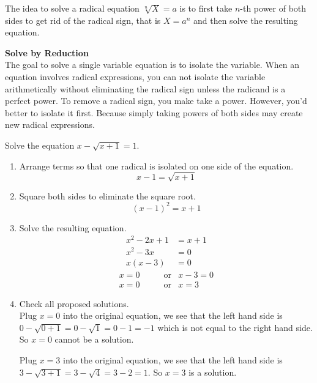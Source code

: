 \documentclass[
  en,11pt]{elegantbook}
\newcommand{\size}[2]{{\fontsize{#1}{0}\selectfont#2}}
\renewenvironment{example}[1][]{
  \refstepcounter{exam}
  \par\noindent\textbf{\color{main}{\examplename} \theexam #1}
  \rmfamily
}{
  \par\ignorespacesafterend
}
\newenvironment{rmdtip}{
	\vspace*{0.5\baselineskip}
	\par\noindent
	\makebox[-3pt][r]{\color{red!90}\size{12}{\HandRight}\,\,}
    \begin{tcolorbox}[
    enhanced,
    title={\textbf{\color{second}Tips}},
    title style={left color=blue!10!green!20!white,right color=yellow!20!blue!20!white},
    colback=cyan!10!white,
    ]
    \sffamily
}{
    \end{tcolorbox}
    \par\ignorespacesafterend
}
\begin{document}
The idea to solve a radical equation \(\sqrt[n]{X}=a\) is to first take \(n\)-th power of both sides to get rid of the radical sign, that is \(X=a^n\) and then solve the resulting equation.

\begin{rmdtip}

\textbf{Solve by Reduction}\\
The goal to solve a single variable equation is to isolate the variable. When an equation involves radical expressions, you can not isolate the variable arithmetically without eliminating the radical sign unless the radicand is a perfect power. To remove a radical sign, you make take a power. However, you'd better to isolate it first. Because simply taking powers of both sides may create new radical expressions.

\end{rmdtip}

\begin{example}
Solve the equation \(x-\sqrt{x+1}=1.\)
\end{example}

\begin{solution}



\begin{enumerate}
\def\labelenumi{\arabic{enumi}.}
\item
  Arrange terms so that one radical is isolated on one side of the equation.
  \[x-1=\sqrt{x+1}\]
\item
  Square both sides to eliminate the square root.
  \[(x-1)^2=x+1\]
\item
  Solve the resulting equation.
  \[
     \begin{aligned}
         x^2-2x+1&=x+1\\
         x^2-3x&=0\\
         x(x-3)&=0
     \end{aligned}
  \]
  \[
  \begin{aligned}
     x =0 & \qquad \text{or} & x-3 =0 \\
     x =0 & \qquad \text{or} & x   =3
  \end{aligned}
  \]
\item
  Check all proposed solutions.\\
  Plug \(x=0\) into the original equation, we see that the left hand side is \(0-\sqrt{0+1}=0-\sqrt{1}=0-1=-1\) which is not equal to the right hand side. So \(x=0\) cannot be a solution.

  Plug \(x=3\) into the original equation, we see that the left hand side is \(3-\sqrt{3+1}=3-\sqrt{4}=3-2=1\). So \(x=3\) is a solution.
\end{enumerate}

\end{solution}
\end{document}
